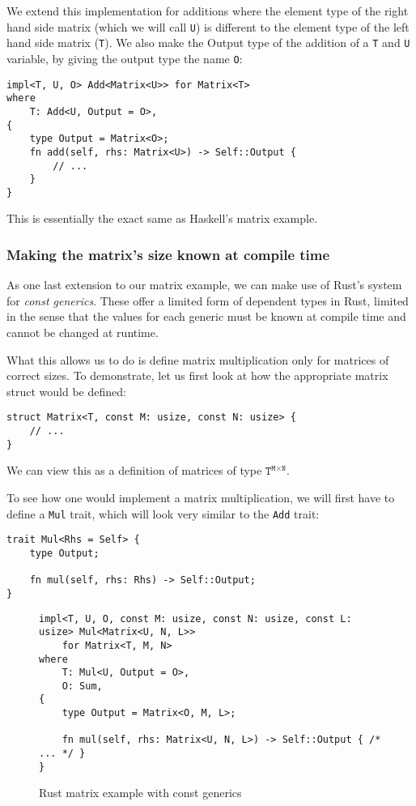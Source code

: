 We extend this implementation for additions where the element type of the right hand side matrix (which we will call \verb|U|) is different to the element type of the left hand side matrix (\verb|T|). We also make the Output type of the addition of a \verb|T| and \verb|U| variable, by giving the output type the name \verb|O|:
\begin{verbatim}
impl<T, U, O> Add<Matrix<U>> for Matrix<T>
where
    T: Add<U, Output = O>,
{
    type Output = Matrix<O>;
    fn add(self, rhs: Matrix<U>) -> Self::Output {
        // ...
    }
}
\end{verbatim}
This is essentially the exact same as Haskell's matrix example.

\subsubsection{Making the matrix's size known at compile time}

As one last extension to our matrix example, we can make use of Rust's system for \emph{const generics}. These offer a limited form of dependent types in Rust, limited in the sense that the values for each generic must be known at compile time and cannot be changed at runtime.

What this allows us to do is define matrix multiplication only for matrices of correct sizes. To demonstrate, let us first look at how the appropriate matrix struct would be defined:
\begin{verbatim}
struct Matrix<T, const M: usize, const N: usize> {
    // ...
}
\end{verbatim}
We can view this as a definition of matrices of type \( \texttt{T}^{\texttt{M} \times \texttt{N}} \).

To see how one would implement a matrix multiplication, we will first have to define a \verb|Mul| trait, which will look very similar to the \verb|Add| trait:
\begin{verbatim}
trait Mul<Rhs = Self> {
    type Output;

    fn mul(self, rhs: Rhs) -> Self::Output;
}
\end{verbatim}

\begin{figure*}
\begin{verbatim}
impl<T, U, O, const M: usize, const N: usize, const L: usize> Mul<Matrix<U, N, L>>
    for Matrix<T, M, N>
where
    T: Mul<U, Output = O>,
    O: Sum,
{
    type Output = Matrix<O, M, L>;

    fn mul(self, rhs: Matrix<U, N, L>) -> Self::Output { /* ... */ }
}
\end{verbatim}
\caption{Rust matrix example with const generics}
\label{full-matrix}
\end{figure*}

